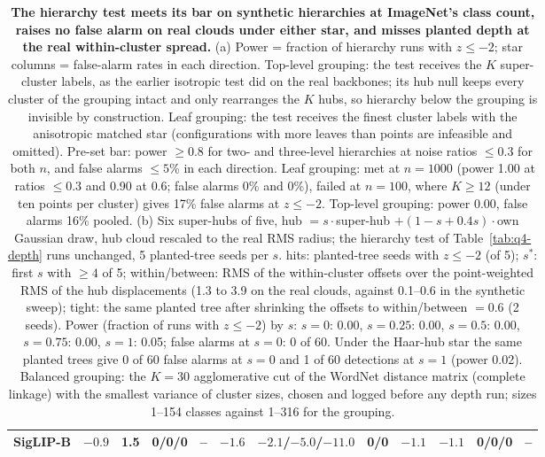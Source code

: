\begin{table}[H]
\begin{tabular}{lcccccc|cc|ccc}
SigLIP-B & $-0.9$ & 1.5 & 0/0/0 & -- & $-1.6$ & $-2.1$/$-5.0$/$-11.0$ & 0/0 & $-1.1$ & $-1.1$ & 0/0/0 & -- \\
\bottomrule
\end{tabular}
\par\vspace{5pt}
\endgroup
\caption{\textbf{The hierarchy test meets its bar on synthetic hierarchies at ImageNet's class count, raises no false alarm on real clouds under either star, and misses planted depth at the real within-cluster spread.} (a) Power = fraction of hierarchy runs with $z\le-2$; star columns = false-alarm rates in each direction. Top-level grouping: the test receives the $K$ super-cluster labels, as the earlier isotropic test did on the real backbones; its hub null keeps every cluster of the grouping intact and only rearranges the $K$ hubs, so hierarchy below the grouping is invisible by construction. Leaf grouping: the test receives the finest cluster labels with the anisotropic matched star (configurations with more leaves than points are infeasible and omitted). Pre-set bar: power $\ge0.8$ for two- and three-level hierarchies at noise ratios $\le0.3$ for both $n$, and false alarms $\le5$\% in each direction. Leaf grouping: met at $n{=}1000$ (power 1.00 at ratios $\le0.3$ and 0.90 at $0.6$; false alarms 0\% and 0\%), failed at $n{=}100$, where $K\ge12$ (under ten points per cluster) gives 17\% false alarms at $z\le-2$. Top-level grouping: power 0.00, false alarms 16\% pooled. (b) Six super-hubs of five, hub $= s\cdot$super-hub $+ (1-s+0.4s)\cdot$own Gaussian draw, hub cloud rescaled to the real RMS radius; the hierarchy test of Table~\ref{tab:q4-depth} runs unchanged, 5 planted-tree seeds per $s$. hits: planted-tree seeds with $z\le-2$ (of 5); $s^*$: first $s$ with $\ge4$ of 5; within/between: RMS of the within-cluster offsets over the point-weighted RMS of the hub displacements (1.3 to 3.9 on the real clouds, against 0.1--0.6 in the synthetic sweep); tight: the same planted tree after shrinking the offsets to within/between $=0.6$ (2 seeds). Power (fraction of runs with $z\le-2$) by $s$: $s{=}0$: 0.00, $s{=}0.25$: 0.00, $s{=}0.5$: 0.00, $s{=}0.75$: 0.00, $s{=}1$: 0.05; false alarms at $s{=}0$: 0 of 60. Under the Haar-hub star the same planted trees give 0 of 60 false alarms at $s{=}0$ and 1 of 60 detections at $s{=}1$ (power 0.02). Balanced grouping: the $K{=}30$ agglomerative cut of the WordNet distance matrix (complete linkage) with the smallest variance of cluster sizes, chosen and logged before any depth run; sizes 1--154 classes against 1--316 for the grouping. %
}
\label{tab:q5-power}
\end{table}
